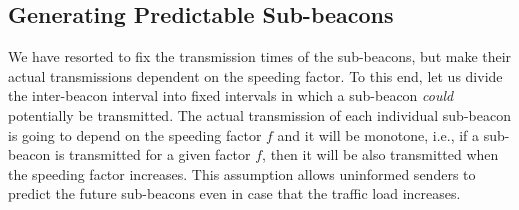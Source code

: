 \documentclass[journal,english,twocolumn,10pt,letterpaper]{IEEEtran}
\begin{document}
\subsection{Generating Predictable Sub-beacons}
\label{sec:gener-pred-extra-1}

We have resorted to fix the transmission times of the sub-beacons, but make
their actual transmissions dependent on the speeding factor. To this end, let
us divide the inter-beacon interval into fixed intervals in which a sub-beacon
\emph{could} potentially be transmitted. The actual transmission of each
individual sub-beacon is going to depend on the speeding factor $f$ and it
will be monotone, i.e., if a sub-beacon is transmitted for a given factor $f$,
then it will be also transmitted when the speeding factor increases. This
assumption allows uninformed senders to predict the future sub-beacons even in
case that the traffic load increases.
\end{document}

